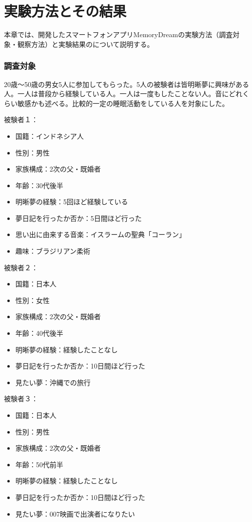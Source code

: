 \chapter{実験方法とその結果}
\label{chap:ledoxea}

本章では、開発したスマートフォンアプリMemoryDreamの実験方法（調査対象・観察方法）と実験結果のについて説明する。

\subsection{調査対象}
20歳〜50歳の男女5人に参加してもらった。5人の被験者は皆明晰夢に興味がある人。一人は普段から経験している人。一人は一度もしたことない人。音にどれくらい敏感かも述べる。比較的一定の睡眠活動をしている人を対象にした。

被験者１：
\begin{itemize}
\item 国籍：インドネシア人
\item 性別：男性
\item 家族構成：2次の父・既婚者
\item 年齢：30代後半
\item 明晰夢の経験：5回ほど経験している
\item 夢日記を行ったか否か：5日間ほど行った
\item 思い出に由来する音楽：イスラームの聖典「コーラン」
\item 趣味：ブラジリアン柔術
\end{itemize}

被験者２：
\begin{itemize}
\item 国籍：日本人
\item 性別：女性
\item 家族構成：2次の父・既婚者
\item 年齢：40代後半
\item 明晰夢の経験：経験したことなし
\item 夢日記を行ったか否か：10日間ほど行った
\item 見たい夢：沖縄での旅行
\end{itemize}

被験者３：
\begin{itemize}
\item 国籍：日本人
\item 性別：男性
\item 家族構成：2次の父・既婚者
\item 年齢：50代前半
\item 明晰夢の経験：経験したことなし
\item 夢日記を行ったか否か：10日間ほど行った
\item 見たい夢：007映画で出演者になりたい
\end{itemize}

